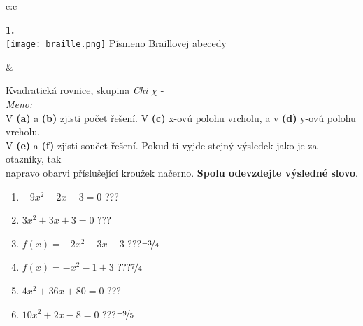 \documentclass[10pt]{report}
\begin{document}
\begin{tabular}{c:c}
\begin{minipage}[c][99mm][t]{0.49\linewidth}
\begin{center}
\begin{minipage}{0.20\linewidth}
\begin{center}
{\Huge\bfseries 1.} \\[2mm]
\texttt{[image: braille.png]}
{\small Písmeno Braillovej abecedy}
\end{center}
\end{minipage}
\end{center}
\end{minipage}
&
\begin{minipage}[c][99mm][t]{0.49\linewidth}
\begin{center}
\vspace{7mm}
{\huge Kvadratická rovnice, skupina \textit{Chi $\chi$} -}\\[4.5mm]
\textit{Meno:}\phantom{xxxxxxxxxxxxxxxxxxxxxxxxxxxxxxxxxxxxxxxxxxxxxxxxxxxxxxxxxxxxxxxxx}\\[3.5mm]
V \textbf{(a)} a \textbf{(b)} zjisti počet řešení. V \textbf{(c)} x-ovú polohu vrcholu, a v \textbf{(d)} y-ovú polohu vrcholu.\\V \textbf{(e)} a \textbf{(f)} zjisti součet řešení. Pokud ti vyjde stejný výsledek jako je za otazníky, tak\\napravo obarvi příslušející kroužek načerno. \textbf{Spolu odevzdejte výsledné slovo}.\\[3mm]
\begin{minipage}{0.77\linewidth}
\begin{center}
\begin{varwidth}{\textwidth}
\begin{enumerate}
\large
\item $-9x^2-2x-3=0$\quad \dotfill\; ???\;\dotfill {}
\item $3x^2+3x+3=0$\quad \dotfill\; ???\;\dotfill {}
\item $f(x)=-2x^2-3x-3$\quad \dotfill\; ???\;\dotfill \quad $\nicefrac{-3}{4}$
\item $f(x)=-x^2-1+3$\quad \dotfill\; ???\;\dotfill \quad $\nicefrac{7}{4}$
\item $4x^2+36x+80=0$\quad \dotfill\; ???\;\dotfill {}
\item $10x^2+2x-8=0$\quad \dotfill\; ???\;\dotfill \quad $\nicefrac{-9}{5}$
\end{enumerate}
\end{varwidth}
\end{center}
\end{minipage}
\begin{minipage}{0.20\linewidth}

\end{minipage}
\end{center}
\end{minipage}
\end{tabular}
\end{document}
